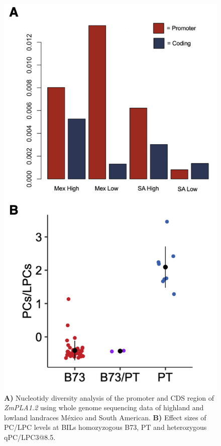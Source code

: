 \documentclass[9pt,twocolumn,twoside,lineno]{BioRxiv}
\begin{document}
\begin{figure}[t]
\begin{center}
\includegraphics[width=0.4\paperwidth]{Sup_Figures/Sup_Fig_5.png}
\caption{\textbf{A)} Nucleotidy diversity analysis of the promoter and CDS region of \textit{ZmPLA1.2} using whole genome sequencing data of highland and lowland landraces México and South American.
\textbf{B)} Effect sizes of PC/LPC levels at BILs homozyzogous B73, PT and heterozygous qPC/LPC3@8.5.
}
\label{SupFig5}
\end{center}
\end{figure} 
\end{document}
